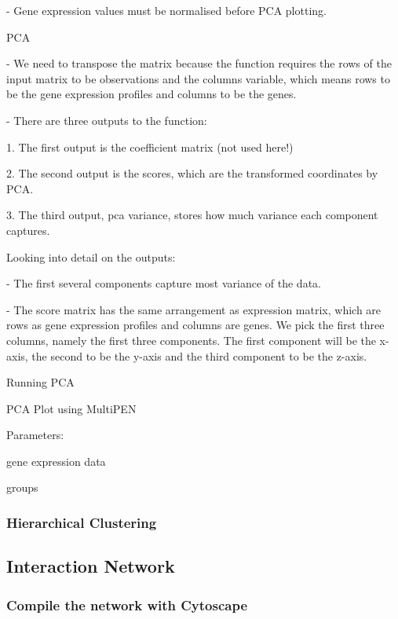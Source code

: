 \documentclass[11pt, oneside]{article}   	%
\begin{document}
- Gene expression values must be normalised before PCA plotting.


PCA

- We need to transpose the matrix because the function requires the rows of the input matrix to be observations and the columns variable, which means rows to be the gene expression profiles and columns to be the genes.

- There are three outputs to the function:

1. The first output is the coefficient matrix (not used here!)

2. The second output is the scores, which are the transformed coordinates by PCA.

3. The third output, pca variance, stores how much variance each component captures.


Looking into detail on the outputs:

- The first several components capture most variance of the data.

- The score matrix has the same arrangement as expression matrix, which are rows as gene expression profiles and columns are genes. We pick the first three columns, namely the first three components. The first component will be the x-axis, the second to be the y-axis and the third component to be the z-axis.

Running PCA

%
%
%
%



PCA Plot using MultiPEN

Parameters:

gene expression data

groups



\subsubsection{Hierarchical Clustering}

\subsection{Interaction Network}
\subsubsection{Compile the network with Cytoscape}
\end{document}
